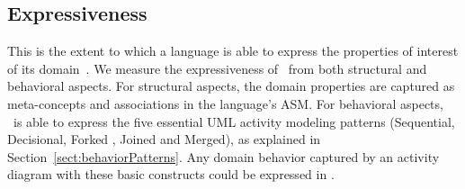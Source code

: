 \subsection{Expressiveness} \label{sect:eval-expressiveness}
This is the extent to which a language is able to express the properties of interest of its domain~\cite{lamsweerde_formal_2000}. We measure the expressiveness of \agl~from both structural and behavioral aspects. 
%
For structural aspects, the domain properties are captured as meta-concepts and associations in the language's ASM. 
%
For behavioral aspects, \agl~is able to express the five essential UML activity modeling patterns (Sequential, Decisional, Forked , Joined and Merged), as explained in Section~\ref{sect:behaviorPatterns}. Any domain behavior captured by an activity diagram with these basic constructs could be expressed in \agl.


